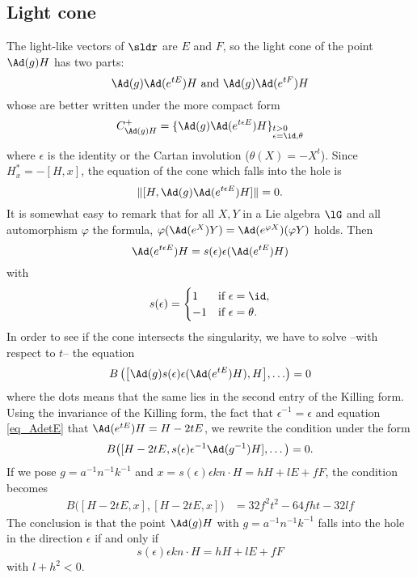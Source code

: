 \subsection{Light cone}

The light-like vectors of $\sldr$ are $E$ and $F$, so the light cone of the point $\Ad(g)H$ has two parts:
\[
\Ad(g)\Ad(e^{tE})H\text{ and } \Ad(g)\Ad(e^{tF})H
\]
whose are better written under the more compact form
\begin{equation}
C^+_{\Ad(g)H}=\{\Ad(g)\Ad(e^{t\epsilon E})H\}_{%
\begin{subarray}{l}
t>0\\
\epsilon=\id,\theta
\end{subarray}
}
\end{equation}
where $\epsilon$ is the identity or the Cartan involution ($\theta(X)=-X^t$). Since $H^*_x=-[H,x]$, the equation of the cone which falls into the hole is
\begin{equation}
\|[H,\Ad(g)\Ad(e^{t\epsilon E})H]\|=0.
\end{equation}
It is somewhat easy to remark that for all $X,Y$ in a Lie algebra $\lG$ and all automorphism $\varphi$ the formula, $\varphi(\Ad(e^X)Y)=\Ad(e^{\varphi X})(\varphi Y)$ holds.
Then
\begin{equation}
\Ad(e^{t\epsilon E})H=s(\epsilon)\epsilon(\Ad(e^{tE})H)
\end{equation}
with 
\[
  s(\epsilon)=
\begin{cases}
1&\text{if $\epsilon=\id$},\\
-1&\text{if $\epsilon=\theta$}.
\end{cases}
\]
In order to see if the cone intersects the singularity, we have to solve --with respect to $t$-- the equation
\begin{equation}
B
\left(%
\big[  \Ad(g)s(\epsilon)\epsilon(\Ad(e^{tE})H),H\big],\ldots
\right)=0
\end{equation}
where the dots means that the same lies in the second entry of the Killing form. Using the invariance of the Killing form, the fact that $\epsilon^{-1}=\epsilon$ and 
    equation \eqref{eq_AdetE} that $\Ad(e^{tE})H=H-2tE$, we rewrite the condition under the form
\begin{equation}
	B\big(	[H-2tE,s(\epsilon)\epsilon^{-1}\Ad(g^{-1})H],\ldots\big)=0.
\end{equation}
If we pose $g=a^{-1} n^{-1} k^{-1}$ and $x=s(\epsilon)\epsilon kn\cdot H=hH+lE+fF$, the condition becomes
\begin{equation}
\begin{split}
	B\big( [H-2tE,x],[H-2tE,x] \big)&=32f^2t^2-64fht-32lf
\end{split}
\end{equation}
The conclusion is that the point $\Ad(g)H$ with $g=a^{-1} n^{-1} k^{-1}$ falls into the hole in the direction $\epsilon$ if and only if
\[
 s(\epsilon)\epsilon kn\cdot H=hH+lE+fF
\]
with $l+h^2<0$.

